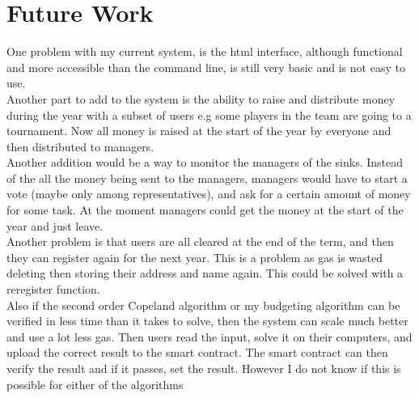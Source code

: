 \chapter{Future Work} \label{Chapter: Future Work}
One problem with my current system, is the html interface, although functional and more accessible than the command line, is still very basic and is not easy to use. \\
Another part to add to the system is the ability to raise and distribute money during the year with a subset of users e.g some players in the team are going to a tournament. Now all money is raised at the start of the year by everyone and then distributed to managers. \\
Another addition would be a way to monitor the managers of the sinks. Instead of the all the money being sent to the managers, managers would have to start a vote (maybe only among representatives), and ask for a certain amount of money for some task. At the moment managers could get the money at the start of the year and just leave. \\
Another problem is that users are all cleared at the end of the term, and then they can register again for the next year. This is a problem as gas is wasted deleting then storing their address and name again. This could be solved with a reregister function. \\
Also if the second order Copeland algorithm or my budgeting algorithm can be verified in less time than it takes to solve, then the system can scale much better and use a lot less gas. Then users read the input, solve it on their computers, and upload the correct result to the smart contract. The smart contract can then verify the result and if it passes, set the result. However I do not know if this is possible for either of the algorithms





